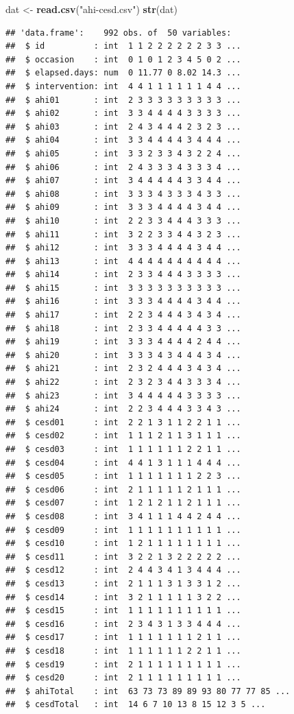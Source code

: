\documentclass[
]{article}
\newenvironment{Shaded}{\begin{snugshade}}{\end{snugshade}}
\newcommand{\FunctionTok}[1]{\textcolor[rgb]{0.13,0.29,0.53}{\textbf{#1}}}
\newcommand{\NormalTok}[1]{#1}
\newcommand{\OtherTok}[1]{\textcolor[rgb]{0.56,0.35,0.01}{#1}}
\newcommand{\StringTok}[1]{\textcolor[rgb]{0.31,0.60,0.02}{#1}}
\begin{document}
\begin{Shaded}
\begin{Highlighting}[]
\NormalTok{dat }\OtherTok{\textless{}{-}} \FunctionTok{read.csv}\NormalTok{(}\StringTok{"ahi{-}cesd.csv"}\NormalTok{)}
\FunctionTok{str}\NormalTok{(dat)}
\end{Highlighting}
\end{Shaded}

\begin{verbatim}
## 'data.frame':    992 obs. of  50 variables:
##  $ id          : int  1 1 2 2 2 2 2 2 3 3 ...
##  $ occasion    : int  0 1 0 1 2 3 4 5 0 2 ...
##  $ elapsed.days: num  0 11.77 0 8.02 14.3 ...
##  $ intervention: int  4 4 1 1 1 1 1 1 4 4 ...
##  $ ahi01       : int  2 3 3 3 3 3 3 3 3 3 ...
##  $ ahi02       : int  3 3 4 4 4 4 3 3 3 3 ...
##  $ ahi03       : int  2 4 3 4 4 4 2 3 2 3 ...
##  $ ahi04       : int  3 3 4 4 4 4 3 4 4 4 ...
##  $ ahi05       : int  3 3 2 3 3 4 3 2 2 4 ...
##  $ ahi06       : int  2 4 3 3 3 4 3 3 3 4 ...
##  $ ahi07       : int  3 4 4 4 4 4 3 3 4 4 ...
##  $ ahi08       : int  3 3 3 4 3 3 3 4 3 3 ...
##  $ ahi09       : int  3 3 3 4 4 4 4 3 4 4 ...
##  $ ahi10       : int  2 2 3 3 4 4 4 3 3 3 ...
##  $ ahi11       : int  3 2 2 3 3 4 4 3 2 3 ...
##  $ ahi12       : int  3 3 3 4 4 4 4 3 4 4 ...
##  $ ahi13       : int  4 4 4 4 4 4 4 4 4 4 ...
##  $ ahi14       : int  2 3 3 4 4 4 3 3 3 3 ...
##  $ ahi15       : int  3 3 3 3 3 3 3 3 3 3 ...
##  $ ahi16       : int  3 3 3 4 4 4 4 3 4 4 ...
##  $ ahi17       : int  2 2 3 4 4 4 3 4 3 4 ...
##  $ ahi18       : int  2 3 3 4 4 4 4 4 3 3 ...
##  $ ahi19       : int  3 3 3 4 4 4 4 2 4 4 ...
##  $ ahi20       : int  3 3 3 4 3 4 4 4 3 4 ...
##  $ ahi21       : int  2 3 2 4 4 4 3 4 3 4 ...
##  $ ahi22       : int  2 3 2 3 4 4 3 3 3 4 ...
##  $ ahi23       : int  3 4 4 4 4 4 3 3 3 3 ...
##  $ ahi24       : int  2 2 3 4 4 4 3 3 4 3 ...
##  $ cesd01      : int  2 2 1 3 1 1 2 2 1 1 ...
##  $ cesd02      : int  1 1 1 2 1 1 3 1 1 1 ...
##  $ cesd03      : int  1 1 1 1 1 1 2 2 1 1 ...
##  $ cesd04      : int  4 4 1 3 1 1 1 4 4 4 ...
##  $ cesd05      : int  1 1 1 1 1 1 1 2 2 3 ...
##  $ cesd06      : int  2 1 1 1 1 1 2 1 1 1 ...
##  $ cesd07      : int  1 2 1 2 1 1 2 1 1 1 ...
##  $ cesd08      : int  3 4 1 1 1 4 4 2 4 4 ...
##  $ cesd09      : int  1 1 1 1 1 1 1 1 1 1 ...
##  $ cesd10      : int  1 2 1 1 1 1 1 1 1 1 ...
##  $ cesd11      : int  3 2 2 1 3 2 2 2 2 2 ...
##  $ cesd12      : int  2 4 4 3 4 1 3 4 4 4 ...
##  $ cesd13      : int  2 1 1 1 3 1 3 3 1 2 ...
##  $ cesd14      : int  3 2 1 1 1 1 1 3 2 2 ...
##  $ cesd15      : int  1 1 1 1 1 1 1 1 1 1 ...
##  $ cesd16      : int  2 3 4 3 1 3 3 4 4 4 ...
##  $ cesd17      : int  1 1 1 1 1 1 1 2 1 1 ...
##  $ cesd18      : int  1 1 1 1 1 1 2 2 1 1 ...
##  $ cesd19      : int  2 1 1 1 1 1 1 1 1 1 ...
##  $ cesd20      : int  2 1 1 1 1 1 1 1 1 1 ...
##  $ ahiTotal    : int  63 73 73 89 89 93 80 77 77 85 ...
##  $ cesdTotal   : int  14 6 7 10 13 8 15 12 3 5 ...
\end{verbatim}
\end{document}
